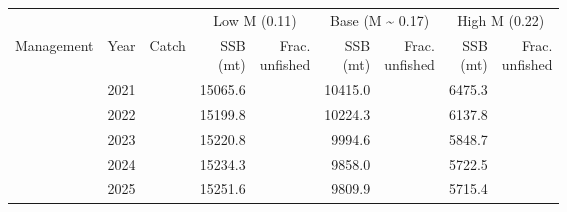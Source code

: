 \begin{table}
\centering
\begin{tabular}[t]{>{}l|l>{}rr>{}r|rrrr}
\toprule
\multicolumn{1}{c}{ } & \multicolumn{1}{c}{ } & \multicolumn{1}{c}{ } & \multicolumn{2}{c}{Low M (0.11)} & \multicolumn{2}{c}{Base (M \textasciitilde{} 0.17)} & \multicolumn{2}{c}{High M (0.22)} \\
\cmidrule(l{3pt}r{3pt}){4-5} \cmidrule(l{3pt}r{3pt}){6-7} \cmidrule(l{3pt}r{3pt}){8-9}
Management & Year & Catch & \makecell{SSB\\(mt)} & \makecell{Frac.\\unfished} & \makecell{SSB\\(mt)} & \makecell{Frac.\\unfished} & \makecell{SSB\\(mt)} & \makecell{Frac.\\unfished}\\
\midrule
 & 2021 & \cellcolor[HTML]{8A8779}{\textcolor{white}{700.0000}} & 15065.6 & \cellcolor[HTML]{46C06F}{\textcolor{white}{0.296}} & 10415.0 & \cellcolor[HTML]{24AA83}{\textcolor{white}{0.394}} & 6475.3 & \cellcolor[HTML]{20A386}{\textcolor{white}{0.419}}\\

 & 2022 & \cellcolor[HTML]{8A8779}{\textcolor{white}{700.0000}} & 15199.8 & \cellcolor[HTML]{44BF70}{\textcolor{white}{0.299}} & 10224.3 & \cellcolor[HTML]{25AB82}{\textcolor{white}{0.387}} & 6137.8 & \cellcolor[HTML]{23A983}{\textcolor{white}{0.397}}\\

 & 2023 & \cellcolor[HTML]{8A8779}{\textcolor{white}{700.0000}} & 15220.8 & \cellcolor[HTML]{44BF70}{\textcolor{white}{0.299}} & 9994.6 & \cellcolor[HTML]{27AD81}{\textcolor{white}{0.378}} & 5848.7 & \cellcolor[HTML]{27AD81}{\textcolor{white}{0.378}}\\

 & 2024 & \cellcolor[HTML]{8A8779}{\textcolor{white}{700.0000}} & 15234.3 & \cellcolor[HTML]{44BF70}{\textcolor{white}{0.299}} & 9858.0 & \cellcolor[HTML]{28AE80}{\textcolor{white}{0.373}} & 5722.5 & \cellcolor[HTML]{29AF7F}{\textcolor{white}{0.370}}\\

 & 2025 & \cellcolor[HTML]{8A8779}{\textcolor{white}{700.0000}} & 15251.6 & \cellcolor[HTML]{42BE71}{\textcolor{white}{0.300}} & 9809.9 & \cellcolor[HTML]{28AE80}{\textcolor{white}{0.371}} & 5715.4 & \cellcolor[HTML]{29AF7F}{\textcolor{white}{0.369}}\\


\end{tabular}
\end{table}
